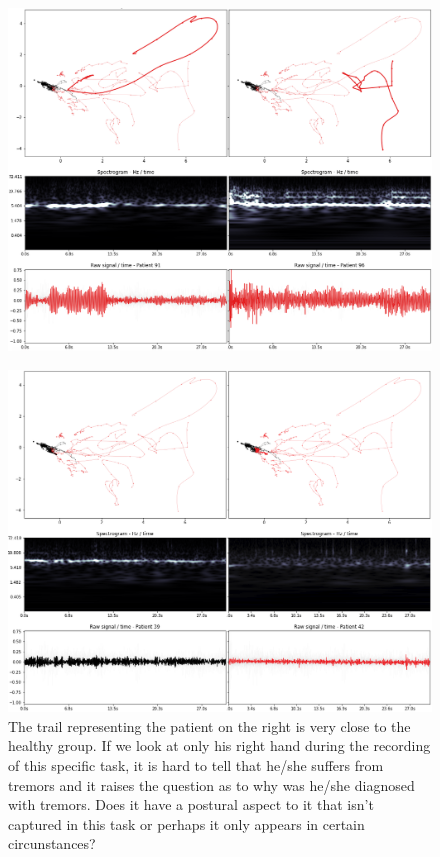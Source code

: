 \begin{figure}[ht]
\centering
\includegraphics[width=\linewidth]{figures/nemo/exp1-9196.png}
\caption{}
\label{fig:exp1-9196}
\end{figure}

\begin{figure}[ht]
\centering
\includegraphics[width=\linewidth]{figures/nemo/exp1-3942.png}
\caption{The trail representing the patient on the right is very close to the healthy group. If we look at only his right hand during the recording of this specific task, it is hard to tell that he/she suffers from tremors and it raises the question as to why was he/she diagnosed with tremors. Does it have a postural aspect to it that isn't captured in this task or perhaps it only appears in certain circunstances?}
\label{fig:exp1-3942}
\end{figure}

